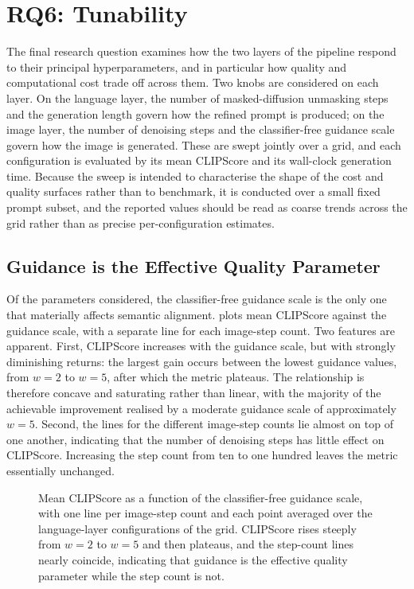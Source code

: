 \documentclass[a4paper,twoside,12pt]{report}
\begin{document}
\section{RQ6: Tunability}
\label{sec:rq6}

The final research question examines how the two layers of the pipeline respond
to their principal hyperparameters, and in particular how quality and
computational cost trade off across them. Two knobs are considered on each
layer. On the language layer, the number of masked-diffusion unmasking steps and
the generation length govern how the refined prompt is produced; on the image
layer, the number of denoising steps and the classifier-free guidance scale
govern how the image is generated. These are swept jointly over a grid, and
each configuration is evaluated by its mean CLIPScore and its wall-clock
generation time. Because the sweep is intended to characterise the shape of the
cost and quality surfaces rather than to benchmark, it is conducted over a small
fixed prompt subset, and the reported values should be read as coarse trends
across the grid rather than as precise per-configuration estimates.

\subsection{Guidance is the Effective Quality Parameter}

Of the parameters considered, the classifier-free guidance scale is the only one
that materially affects semantic alignment.  plots mean
CLIPScore against the guidance scale, with a separate line for each image-step
count. Two features are apparent. First, CLIPScore increases with the guidance
scale, but with strongly diminishing returns: the largest gain occurs between
the lowest guidance values, from \(w = 2\) to \(w = 5\), after which the metric
plateaus. The relationship is therefore concave and saturating rather than
linear, with the majority of the achievable improvement realised by a moderate
guidance scale of approximately \(w = 5\). Second, the lines for the different
image-step counts lie almost on top of one another, indicating that the number
of denoising steps has little effect on CLIPScore. Increasing the step count
from ten to one hundred leaves the metric essentially unchanged.

\begin{figure}[H]
\centering
\caption[CLIPScore versus guidance scale]{Mean CLIPScore as a function of the
classifier-free guidance scale, with one line per image-step count and each
point averaged over the language-layer configurations of the grid. CLIPScore
rises steeply from \(w = 2\) to \(w = 5\) and then plateaus, and the step-count
lines nearly coincide, indicating that guidance is the effective quality
parameter while the step count is not.}
\label{fig:rq6_saturation}
\end{figure}
\end{document}
